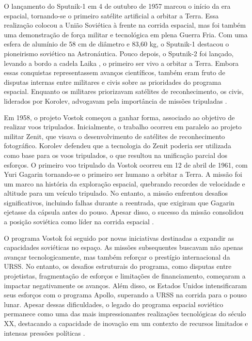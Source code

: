 O lançamento do Sputnik-1 em 4 de outubro de 1957 \citep{nasaSputnik1} marcou o início da era espacial, tornando-se o primeiro satélite artificial a orbitar a Terra. Essa realização colocou a União Soviética à frente na corrida espacial, mas foi também uma demonstração de força militar e tecnológica em plena Guerra Fria. Com uma esfera de alumínio de 58 cm de diâmetro e 83,60 kg, o Sputnik-1 destacou o pioneirismo soviético na Astronáutica. Pouco depois, o Sputnik-2 foi lançado, levando a bordo a cadela Laika \citep{nasaSputnik2} , o primeiro ser vivo a orbitar a Terra. Embora essas conquistas representassem avanços científicos, também eram fruto de disputas internas entre militares e civis sobre as prioridades do programa espacial. Enquanto os militares priorizavam satélites de reconhecimento, os civis, liderados por Korolev, advogavam pela importância de missões tripuladas \citep{betzler2024}.

Em 1958, o projeto Vostok \citep{nasaVostok1} começou a ganhar forma, associado ao objetivo de realizar voos tripulados. Inicialmente, o trabalho ocorreu em paralelo ao projeto militar Zenit, que visava o desenvolvimento de satélites de reconhecimento fotográfico. Korolev defendeu que a tecnologia do Zenit \citep{astronautixZenit} poderia ser utilizada como base para os voos tripulados, o que resultou na unificação parcial dos esforços. O primeiro voo tripulado da Vostok ocorreu em 12 de abril de 1961, com Yuri Gagarin tornando-se o primeiro ser humano a orbitar a Terra. A missão foi um marco na história da exploração espacial, quebrando recordes de velocidade e altitude para um veículo tripulado. No entanto, a missão enfrentou desafios significativos, incluindo falhas durante a reentrada, que exigiram que Gagarin ejetasse da cápsula antes do pouso. Apesar disso, o sucesso da missão consolidou a posição soviética como líder na corrida espacial \citep{betzler2024}.

O programa Vostok foi seguido por novas iniciativas destinadas a expandir as capacidades soviéticas no espaço. As missões subsequentes buscavam não apenas avançar tecnologicamente, mas também reforçar o prestígio internacional da URSS. No entanto, os desafios estruturais do programa, como disputas entre projetistas, fragmentação de esforços e limitações de financiamento, começaram a impactar negativamente os avanços. Além disso, os Estados Unidos intensificaram seus esforços com o programa Apollo, superando a URSS na corrida para o pouso lunar. Apesar dessas dificuldades, o legado do programa espacial soviético permanece como uma das mais impressionantes realizações tecnológicas do século XX, destacando a capacidade de inovação em um contexto de recursos limitados e intensas pressões políticas \citep{betzler2024}.

